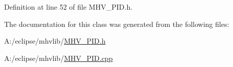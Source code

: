 \-Definition at line 52 of file \-M\-H\-V\-\_\-\-P\-I\-D.\-h.



\-The documentation for this class was generated from the following files\-:\begin{DoxyCompactItemize}
\item 
\-A\-:/eclipse/mhvlib/\hyperlink{_m_h_v___p_i_d_8h}{\-M\-H\-V\-\_\-\-P\-I\-D.\-h}\item 
\-A\-:/eclipse/mhvlib/\hyperlink{_m_h_v___p_i_d_8cpp}{\-M\-H\-V\-\_\-\-P\-I\-D.\-cpp}\end{DoxyCompactItemize}
